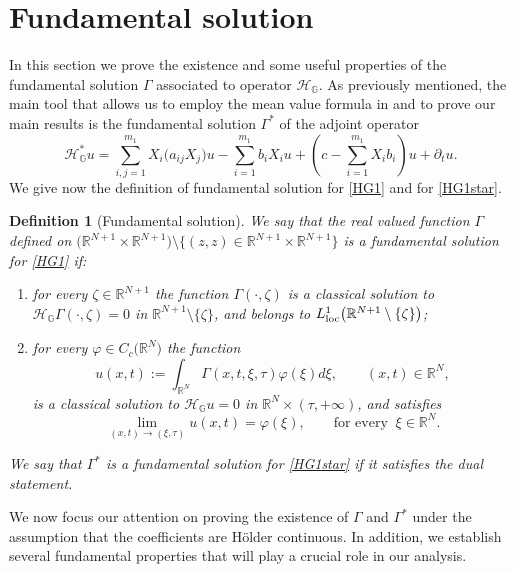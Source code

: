 \documentclass[11pt,a4paper]{article}
\newtheorem{definition}[theorem]{\bf Definition}
\numberwithin{equation}{section}
\def \rn {{\mathbb {R}}^{N}}
\def \rnn {{\mathbb {R}}^{N+1}}
\def \GG {{\mathbb{G}}}
\def \loc {{\text{\rm loc}}}
\def \p {\partial}
\def \H {\mathscr{H}_\GG}
\def \HH{\mathscr{H}_\GG^*}
\def \G {{\Gamma}}
\def \t {{\tau}}
\def \x {{\xi}}
\def \z {{\zeta}}
\def \phi {{\varphi}}
\begin{document}
\section{Fundamental solution}\label{Fundamental}
In this section we prove the existence and some useful properties of the fundamental solution $\G$ associated to operator $\H$. As previously mentioned, the main tool that allows us to employ the mean value formula in \cite{pallara2023meanvalueformulasclassical} and to prove our main results is the fundamental solution $\G^*$ of the adjoint operator 
\begin{equation}\label{HG1star}  
	\HH u =\sum_{i,j=1}^{m_1} X_i\big(a_{ij}X_j\big)u - \sum_{i=1}^{m_1} b_iX_iu+ \left(c-\sum_{i=1}^{m_1}X_ib_i\right)u+\p_t u.
\end{equation}
We give now the definition of fundamental solution for \eqref{HG1} and for \eqref{HG1star}.
\begin{definition}[Fundamental solution]\label{Def-fundamental}
	We say that the real valued function $\G$ defined on $\big(\rnn\times\rnn\big)\setminus \big\{(z,z)\in \rnn\times \rnn\big\}$ is a fundamental solution for \eqref{HG1} if:
	\begin{enumerate}
		\item for every $\z\in\rnn$ the function $ \G(\cdot,\z)$ is a classical solution to $ \H\G(\cdot,\z)\!=\!0$ in $\rnn \setminus \{\z\}$, and belongs to $L^1_\loc \big(\rnn \setminus \{\z\}\big)$;
		\item for every $\phi \in C_c\big(\rn\big)$ the function
		\begin{equation}\label{delta}
			u(x,t):=\int_{\rn} \G(x,t,\xi,\t)\phi(\xi)d\xi,\qquad (x,t) \in \rn,
		\end{equation}
		is a classical solution to $\H u=0$ in $\rn\times (\t,+\infty)$, and satisfies 
		\begin{equation}
			\lim_{(x,t)\to(\x,\t)} u(x,t) = \phi(\x),\qquad\text{for every}\;\;\x\in\rn. 
		\end{equation} 
	\end{enumerate}
	We say that $\G^*$ is a fundamental solution for \eqref{HG1star} if it satisfies the dual statement.
\end{definition}
We now focus our attention on proving the existence of $\G$ and $\G^*$ under the assumption that the coefficients are H\"older continuous. In addition, we establish several fundamental properties that will play a crucial role in our analysis.
\end{document}
